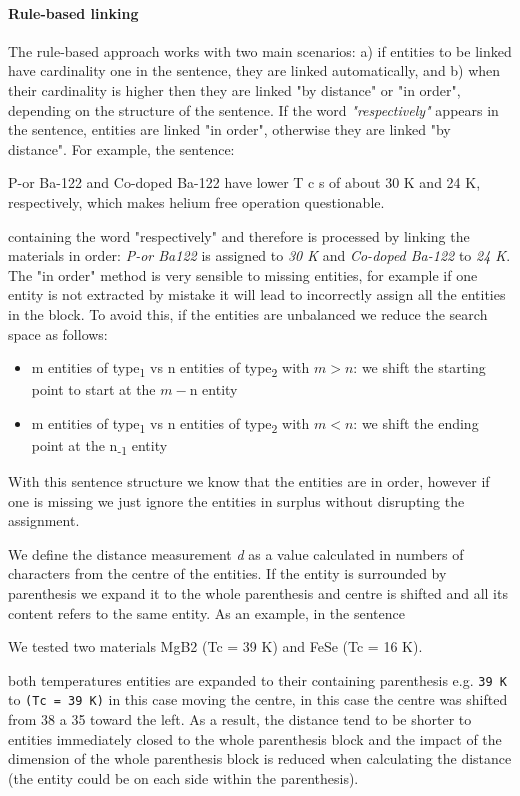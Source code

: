 \documentclass{article}
\begin{document}
\paragraph{Rule-based linking}
The rule-based approach works with two main scenarios: a) if entities to be linked have cardinality one in the sentence, they are linked automatically, and b) when their cardinality is higher then they are linked "by distance" or "in order", depending on the structure of the sentence. 
If the word \textit{"respectively"} appears in the sentence, entities are linked "in order", otherwise they are linked "by distance". 
For example, the sentence:  
\begin{displayquote}
P-or Ba-122  and Co-doped Ba-122 have lower T c s of about 30 K and 24 K, respectively, which makes helium free operation questionable.
\end{displayquote}
containing the word "respectively" and therefore is processed by linking the materials in order: \textit{P-or Ba122} is assigned to \textit{30 K} and \textit{Co-doped Ba-122} to \textit{24 K}.
The "in order" method is very sensible to missing entities, for example if one entity is not extracted by mistake it will lead to incorrectly assign all the entities in the block. To avoid this, if the entities are unbalanced we reduce the search space as follows: 
\begin{itemize}
    \item m entities of type\textsubscript{1} vs n entities of type\textsubscript{2} with $m > n$: we shift the starting point to start at the $m - $n entity 
    \item m entities of type\textsubscript{1} vs n entities of type\textsubscript{2} with $m < n$: we shift the ending point at the n\textsubscript{-1} entity
\end{itemize}
With this sentence structure we know that the entities are in order, however if one is missing we just ignore the entities in surplus without disrupting the assignment. 

We define the distance measurement \textit{d} as a value calculated in numbers of characters from the centre of the entities. 
If the entity is surrounded by parenthesis we expand it to the whole parenthesis and centre is shifted and all its content refers to the same entity. 
As an example, in the sentence
\begin{displayquote}
We tested two materials MgB2 (Tc = 39 K) and FeSe (Tc = 16 K).
\end{displayquote}
both temperatures entities are expanded to their containing parenthesis e.g. \texttt{39 K} to \texttt{(Tc = 39 K)} in this case moving the centre, in this case the centre was shifted from 38 a 35 toward the left.
As a result, the distance tend to be shorter to entities immediately closed to the whole parenthesis block and the impact of the dimension of the whole parenthesis block is reduced when calculating the distance (the entity could be on each side within the parenthesis). 
\end{document}
